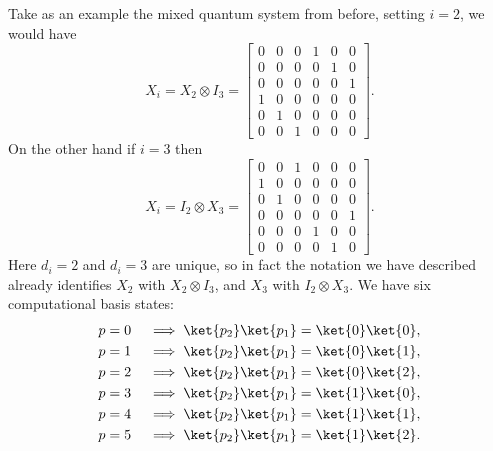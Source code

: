 Take as an example the mixed quantum system from before, setting $i = 2$, we would have
\[X_i = X_2 \otimes I_3 = \begin{bmatrix}
0 & 0 & 0 & 1 & 0 & 0 \\
0 & 0 & 0 & 0 & 1 & 0 \\
0 & 0 & 0 & 0 & 0 & 1 \\
1 & 0 & 0 & 0 & 0 & 0 \\
0 & 1 & 0 & 0 & 0 & 0 \\
0 & 0 & 1 & 0 & 0 & 0
\end{bmatrix}.\]
On the other hand if $i = 3$ then
\[X_i = I_2 \otimes X_3 = \begin{bmatrix}
	0 & 0 & 1 & 0 & 0 & 0 \\
	1 & 0 & 0 & 0 & 0 & 0 \\
	0 & 1 & 0 & 0 & 0 & 0 \\
	0 & 0 & 0 & 0 & 0 & 1 \\
	0 & 0 & 0 & 1 & 0 & 0 \\
	0 & 0 & 0 & 0 & 1 & 0
\end{bmatrix}.\]
Here $d_i = 2$ and $d_i = 3$ are unique, so in fact the notation we have described already identifies $X_2$ with $X_2 \otimes I_3$, and $X_3$ with $I_2 \otimes X_3$. We have six computational basis states:
\begin{align*}
	p = 0 &&& \implies \ket{p_2}\ket{p_1} = \ket{0}\ket{0}, \\
	p = 1 &&& \implies \ket{p_2}\ket{p_1} = \ket{0}\ket{1}, \\
	p = 2 &&& \implies \ket{p_2}\ket{p_1} = \ket{0}\ket{2}, \\
	p = 3 &&& \implies \ket{p_2}\ket{p_1} = \ket{1}\ket{0}, \\
	p = 4 &&& \implies \ket{p_2}\ket{p_1} = \ket{1}\ket{1}, \\
	p = 5 &&& \implies \ket{p_2}\ket{p_1} = \ket{1}\ket{2}.
\end{align*}

